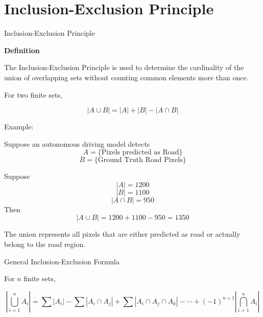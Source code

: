 \section{Inclusion-Exclusion Principle}

\begin{frame}{Inclusion-Exclusion Principle}

\textbf{Definition}

\vspace{0.3cm}

The Inclusion-Exclusion Principle is used to determine the
cardinality of the union of overlapping sets without counting
common elements more than once.

\vspace{0.5cm}

For two finite sets,

\[
|A\cup B|
=
|A|
+
|B|
-
|A\cap B|
\]

\end{frame}


\begin{frame}{Example:}

Suppose an autonomous driving model detects
\[
A=
\{\text{Pixels predicted as Road}\}
\]
\[
B=
\{\text{Ground Truth Road Pixels}\}
\]

Suppose
\[
|A|=1200
\]
\[
|B|=1100
\]
\[
|A\cap B|=950
\]
Then
\[
|A\cup B|
=
1200+1100-950
=
1350
\]

The union represents all pixels that are
either predicted as road or actually belong
to the road region.

\end{frame}

\begin{frame}{General Inclusion-Exclusion Formula}

For \(n\) finite sets,

\vspace{0.3cm}

\[
\left|
\bigcup_{i=1}^{n}
A_i
\right|
=
\sum |A_i|
-
\sum |A_i\cap A_j|
+
\sum |A_i\cap A_j\cap A_k|
-\cdots
+(-1)^{n+1}
\left|
\bigcap_{i=1}^{n}
A_i
\right|
\]

\end{frame}